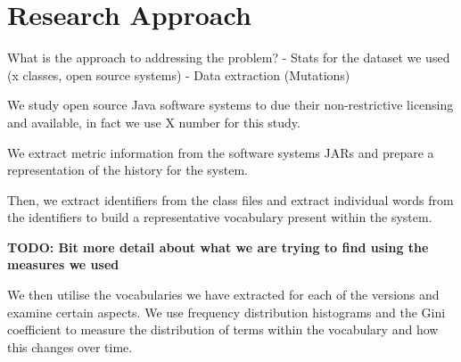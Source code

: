 


\section{Research Approach} %
\label{sec:research_approach}
What is the approach to addressing the problem?
- Stats for the dataset we used (x classes, open source systems)
- Data extraction (Mutations)

We study open source Java software systems to due their non-restrictive licensing and available, in fact we use X number for this study.

We extract metric information from the software systems JARs and prepare a representation of the history for the system.

Then, we extract identifiers from the class files and extract individual words from the identifiers to build a representative vocabulary present within the system.

\textbf{TODO: Bit more detail about what we are trying to find using the measures we used}

We then utilise the vocabularies we have extracted for each of the versions and examine certain aspects. We use frequency distribution histograms and the Gini coefficient to measure the distribution of terms within the vocabulary and how this changes over time.

